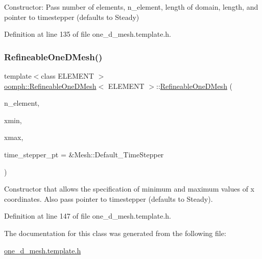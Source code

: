 Constructor\+: Pass number of elements, n\+\_\+element, length of domain, length, and pointer to timestepper (defaults to Steady) 



Definition at line 135 of file one\+\_\+d\+\_\+mesh.\+template.\+h.

\mbox{\label{classoomph_1_1RefineableOneDMesh_a6745ddd579ead642b9eac1b1520d4b5c}} 
\subsubsection{\texorpdfstring{Refineable\+One\+D\+Mesh()}{RefineableOneDMesh()}\hspace{0.1cm}{\footnotesize\ttfamily [2/2]}}
{\footnotesize\ttfamily template$<$class E\+L\+E\+M\+E\+NT $>$ \\
\hyperlink{classoomph_1_1RefineableOneDMesh}{oomph\+::\+Refineable\+One\+D\+Mesh}$<$ E\+L\+E\+M\+E\+NT $>$\+::\hyperlink{classoomph_1_1RefineableOneDMesh}{Refineable\+One\+D\+Mesh} (\begin{DoxyParamCaption}\item[{const unsigned \&}]{n\+\_\+element,  }\item[{const double \&}]{xmin,  }\item[{const double \&}]{xmax,  }\item[{Time\+Stepper $\ast$}]{time\+\_\+stepper\+\_\+pt = {\ttfamily \&Mesh\+:\+:Default\+\_\+TimeStepper} }\end{DoxyParamCaption})\hspace{0.3cm}{\ttfamily [inline]}}



Constructor that allows the specification of minimum and maximum values of x coordinates. Also pass pointer to timestepper (defaults to Steady). 



Definition at line 147 of file one\+\_\+d\+\_\+mesh.\+template.\+h.



The documentation for this class was generated from the following file\+:\begin{DoxyCompactItemize}
\item 
\hyperlink{one__d__mesh_8template_8h}{one\+\_\+d\+\_\+mesh.\+template.\+h}\end{DoxyCompactItemize}
